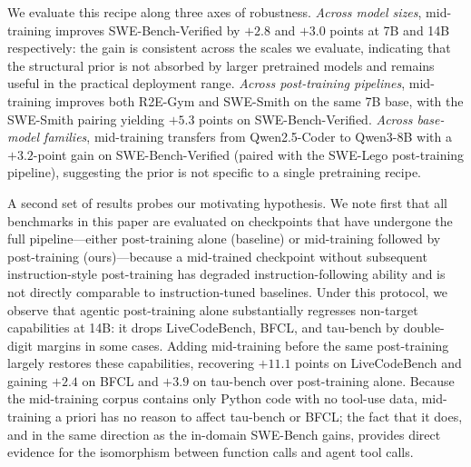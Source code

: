 We evaluate this recipe along three axes of robustness. \emph{Across model
sizes}, mid-training improves SWE-Bench-Verified by $+2.8$ and $+3.0$
points at 7B and 14B respectively: the gain is consistent
across the scales we evaluate, indicating that the structural prior is not
absorbed by larger pretrained models and remains useful in the practical
deployment range. \emph{Across post-training pipelines}, mid-training
improves both R2E-Gym and SWE-Smith on the same 7B base, with the SWE-Smith
pairing yielding $+5.3$ points on SWE-Bench-Verified.
\emph{Across base-model families}, mid-training transfers from
Qwen2.5-Coder to Qwen3-8B with a $+3.2$-point gain on SWE-Bench-Verified
(paired with the SWE-Lego post-training pipeline), suggesting the prior is
not specific to a single pretraining recipe.

A second set of results probes our motivating hypothesis. We note first
that all benchmarks in this paper are evaluated on checkpoints that have
undergone the full pipeline---either post-training alone (baseline) or
mid-training followed by post-training (ours)---because a mid-trained
checkpoint without subsequent instruction-style post-training has degraded
instruction-following ability and is not directly comparable to
instruction-tuned baselines. Under this protocol, we observe that agentic
post-training alone substantially regresses non-target capabilities at
14B: it drops LiveCodeBench, BFCL, and tau-bench by double-digit margins
in some cases. Adding mid-training before the same post-training largely
restores these capabilities, recovering $+11.1$ points on LiveCodeBench
and gaining $+2.4$ on BFCL and $+3.9$ on tau-bench over post-training
alone. Because the mid-training corpus contains only Python code with no
tool-use data, mid-training a priori has no reason to affect tau-bench or
BFCL; the fact that it does, and in the same direction as the in-domain
SWE-Bench gains, provides direct evidence for the isomorphism between
function calls and agent tool calls.

